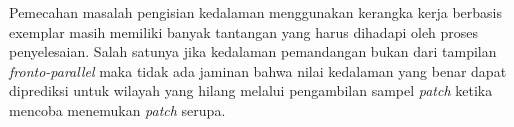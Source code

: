 Pemecahan masalah pengisian kedalaman menggunakan kerangka kerja berbasis exemplar masih memiliki banyak tantangan yang harus dihadapi oleh proses penyelesaian.  Salah satunya jika kedalaman pemandangan bukan dari tampilan \textit{fronto-parallel} maka tidak ada jaminan bahwa nilai kedalaman yang benar dapat diprediksi untuk wilayah yang hilang melalui pengambilan sampel \textit{patch} ketika mencoba menemukan \textit{patch} serupa.
